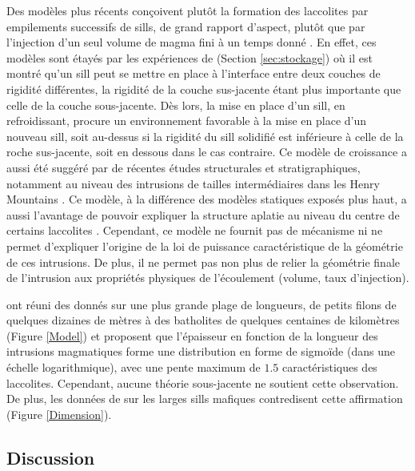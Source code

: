 Des modèles plus récents conçoivent plutôt la formation des laccolites
par empilements successifs de sills, de grand rapport d'aspect, plutôt
que par  l'injection d'un seul volume  de magma fini à  un temps donné
\citep{Menand:2011ki}.   En effet,  ces  modèles sont  étayés par  les
expériences de \citet{Kavanagh:2006ig} (Section \ref{sec:stockage}) où
il est montré  qu'un sill peut se mettre en  place à l'interface entre
deux  couches  de  rigidité  différentes, la  rigidité  de  la  couche
sus-jacente   étant   plus  importante   que   celle   de  la   couche
sous-jacente. Dès lors, la mise  en place d'un sill, en refroidissant,
procure un  environnement favorable  à la mise  en place  d'un nouveau
sill, soit au-dessus si la rigidité du sill solidifié est inférieure à
celle  de  la   roche  sus-jacente,  soit  en  dessous   dans  le  cas
contraire. Ce modèle de croissance a aussi été suggéré par de récentes
études  structurales  et  stratigraphiques, notamment  au  niveau  des
intrusions  de   tailles  intermédiaires  dans  les   Henry  Mountains
\citep{Horsman:2005ct,Morgan:2008hj,Horsman:2009gea,Menand:2011ki}. Ce
modèle, à  la différence  des modèles statiques  exposés plus  haut, a
aussi l'avantage de  pouvoir expliquer la structure  aplatie au niveau
du centre de certains laccolites \citep{Morgan:2008hj}.  Cependant, ce
modèle ne fournit pas de  mécanisme ni ne permet d'expliquer l'origine
de  la  loi  de  puissance  caractéristique de  la  géométrie  de  ces
intrusions. De plus, il ne permet  pas non plus de relier la géométrie
finale  de  l'intrusion  aux   propriétés  physiques  de  l'écoulement
(volume, taux d'injection).

\citet{Nachwuchskoechin:2002tv}  ont réuni  des  donnés  sur une  plus
grande plage  de longueurs, de  petits filons de quelques  dizaines de
mètres à  des batholites de  quelques centaines de  kilomètres (Figure
\ref{Model}) et proposent  que l'épaisseur en fonction  de la longueur
des intrusions magmatiques forme une distribution en forme de sigmoïde
(dans  une échelle  logarithmique), avec  une pente  maximum de  $1.5$
caractéristiques   des   laccolites.     Cependant,   aucune   théorie
sous-jacente ne soutient  cette observation.  De plus,  les données de
\citet{Cruden:tg}  sur les  larges sills  mafiques contredisent  cette
affirmation (Figure \ref{Dimension}).

\subsection{Discussion}
\label{sec:conclusion}

